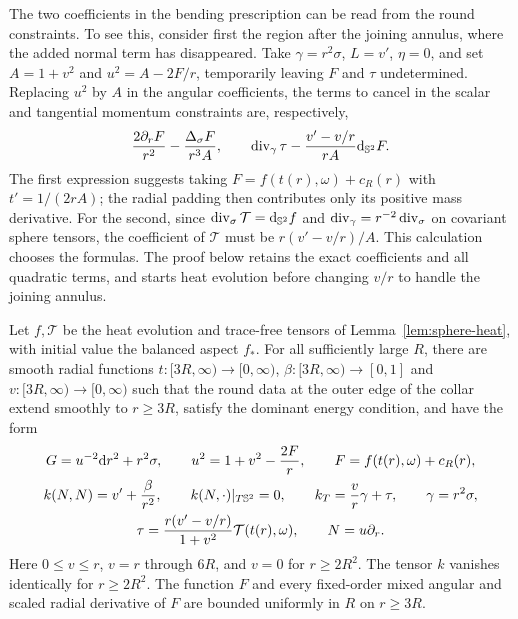 The two coefficients in the bending prescription can be read from the
round constraints. To see this, consider first the region after the
joining annulus, where the added normal term has disappeared. Take
$\gamma=r^2\sigma$, $L=v'$, $\eta=0$, and set $A=1+v^2$ and
$u^2=A-2F/r$, temporarily leaving $F$ and $\tau$ undetermined.
Replacing $u^2$ by $A$ in the angular coefficients, the terms to cancel
in the scalar and tangential momentum constraints are, respectively,
\[
 \frac{2\partial_rF}{r^2}-\frac{\Delta_\sigma F}{r^3A},
 \qquad
 \operatorname{div}_\gamma\tau-\frac{v'-v/r}{rA}\mathrm d_{\mathbb S^2}F.
\]
The first expression suggests taking $F=f(t(r),\omega)+c_R(r)$
with $t'=1/(2rA)$; the radial padding then contributes only its positive
mass derivative. For the second, since
$\operatorname{div}_\sigma\mathcal T=\mathrm d_{\mathbb S^2}f$ and
$\operatorname{div}_\gamma=r^{-2}\operatorname{div}_\sigma$ on covariant sphere tensors,
the coefficient of $\mathcal T$ must be $r(v'-v/r)/A$.
This calculation chooses the formulas. The proof below retains the
exact coefficients and all quadratic terms, and starts heat evolution
before changing $v/r$ to handle the joining annulus.

\begin{lemma}\label{lem:bending}
Let $f,\mathcal T$ be the heat evolution and trace-free tensors of
Lemma~\ref{lem:sphere-heat}, with initial value the balanced aspect
$f_*$. For all sufficiently large $R$, there are smooth radial
functions $t:[3R,\infty)\to[0,\infty)$,
$\beta:[3R,\infty)\to[0,1]$ and $v:[3R,\infty)\to[0,\infty)$
such that the round data at the outer edge of the collar extend
smoothly to $r\geq3R$, satisfy the dominant energy condition,
and have the form
\begin{equation}\label{eq:outer-data}
 \begin{gathered}
 G=u^{-2}\mathrm dr^2+r^2\sigma,\qquad
 u^2=1+v^2-\frac{2F}{r},\qquad
 F=f(t(r),\omega)+c_R(r),\\
 k(N,N)=v'+\frac{\beta}{r^2},\qquad
 k(N,\cdot)|_{T\mathbb S^2}=0,\qquad
 k_T=\frac vr\gamma+\tau,\qquad \gamma=r^2\sigma,\\
 \tau=\frac{r(v'-v/r)}{1+v^2}\mathcal T(t(r),\omega),
 \qquad N=u\partial_r.
 \end{gathered}
\end{equation}
Here $0\leq v\leq r$, $v=r$ through $6R$, and $v=0$ for
$r\geq2R^2$. The tensor $k$ vanishes identically for $r\geq2R^2$.
The function $F$ and every fixed-order mixed angular and scaled
radial derivative of $F$ are bounded uniformly in $R$ on $r\geq3R$.
\end{lemma}

